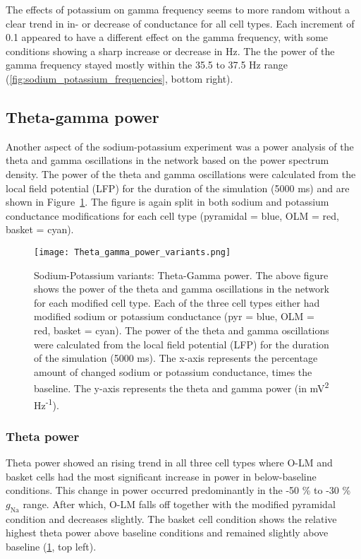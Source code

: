 The effects of potassium on gamma frequency seems to more random without a clear trend in in- or decrease of conductance for all cell types.
Each increment of 0.1 appeared to have a different effect on the gamma frequency, with some conditions showing a sharp increase or decrease in Hz.
The the power of the gamma frequency stayed mostly within the 35.5 to 37.5 Hz range (\ref{fig:sodium_potassium_frequencies}, bottom right).
\subsection{Theta-gamma power}
Another aspect of the sodium-potassium experiment was a power analysis of the theta and gamma oscillations in the network based on the power spectrum density.
The power of the theta and gamma oscillations were calculated from the local field potential (LFP) for the duration of the simulation (5000 ms) and are shown in Figure~\ref{fig:sodium_potassium_power}.
The figure is again split in both sodium and potassium conductance modifications for each cell type (pyramidal = blue, OLM = red, basket = cyan).

\begin{figure}[htbp]
    \centering
    \texttt{[image: Theta\_gamma\_power\_variants.png]}
    \caption[Sodium-Potassium variants: Theta-Gamma power]{Sodium-Potassium variants: Theta-Gamma power.
        The above figure shows the power of the theta and gamma oscillations in the network for each modified cell type.
        Each of the three cell types either had modified sodium or potassium conductance (pyr = blue, OLM = red, basket = cyan).
        The power of the theta and gamma oscillations were calculated from the local field potential (LFP) for the duration of the simulation (5000 ms).
        The x-axis represents the percentage amount of changed sodium or potassium conductance, times the baseline.
        The y-axis represents the theta and gamma power (in mV\textsuperscript{2} Hz\textsuperscript{-1}).}\label{fig:sodium_potassium_power}
\end{figure}

\subsubsection{Theta power}
Theta power showed an rising trend in all three cell types where O-LM and basket cells had the most significant increase in power in below-baseline conditions.
This change in power occurred predominantly in the -50 \% to -30 \% \(g_{\text{Na}}\) range.
After which, O-LM falls off together with the modified pyramidal condition and decreases slightly.
The basket cell condition shows the relative highest theta power above baseline conditions and remained slightly above baseline (\ref{fig:sodium_potassium_power}, top left).

